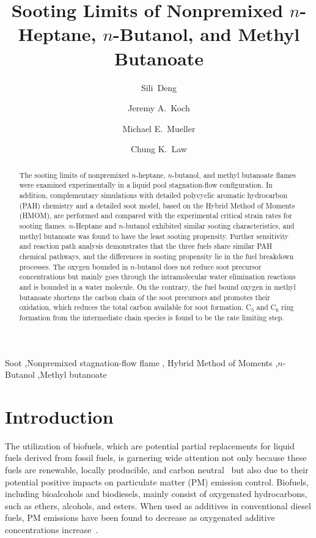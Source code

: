 \documentclass[review,3p,times]{elsarticleUS}
\begin{document}
\begin{frontmatter}

\title{Sooting Limits of Nonpremixed $n$-Heptane, $n$-Butanol, and Methyl Butanoate}

\author{Sili~Deng}
\author{Jeremy A.~Koch}
\author{Michael E.~Mueller}
\author{Chung K.~Law}

\address{Department of Mechanical and Aerospace Engineering, Princeton University, Princeton, NJ 08544, USA}


\begin{abstract}
The sooting limits of nonpremixed $n$-heptane, $n$-butanol, and methyl butanoate flames were examined experimentally in a liquid pool stagnation-flow configuration. In addition, complementary simulations with detailed polycyclic aromatic hydrocarbon (PAH) chemistry and a detailed soot model, based on the Hybrid Method of Moments (HMOM), are performed and compared with the experimental critical strain rates for sooting flames. $n$-Heptane and $n$-butanol exhibited similar sooting characteristics, and methyl butanoate was found to have the least sooting propensity. Further sensitivity and reaction path analysis demonstrates that the three fuels share similar PAH chemical pathways, and the differences in sooting propensity lie in the fuel breakdown processes. The oxygen bounded in $n$-butanol does not reduce soot precursor concentrations but mainly goes through the intramolecular water elimination reactions and is bounded in a water molecule. On the contrary, the fuel bound oxygen in methyl butanoate shortens the carbon chain of the soot precursors and promotes their oxidation, which reduces the total carbon available for soot formation. C$_5$ and C$_6$ ring formation from the intermediate chain species is found to be the rate limiting step. 
\end{abstract}

\begin{keyword} 
Soot \sep Nonpremixed stagnation-flow flame \sep
Hybrid Method of Moments \sep $n$-Butanol \sep Methyl butanoate
\end{keyword}

\end{frontmatter}


\section{Introduction}

The utilization of biofuels, which are potential partial replacements for liquid fuels derived from fossil fuels, is garnering wide attention not only because these fuels are renewable, locally producible, and carbon neutral~\cite{liu11} but also due to their potential positive impacts on particulate matter (PM) emission control. Biofuels, including bioalcohols and biodiesels, mainly consist of oxygenated hydrocarbons, such as ethers, alcohols, and esters. When used as additives in conventional diesel fuels, PM emissions have been found to decrease as oxygenated additive concentrations increase~\cite{graboski98}. 
\end{document}
